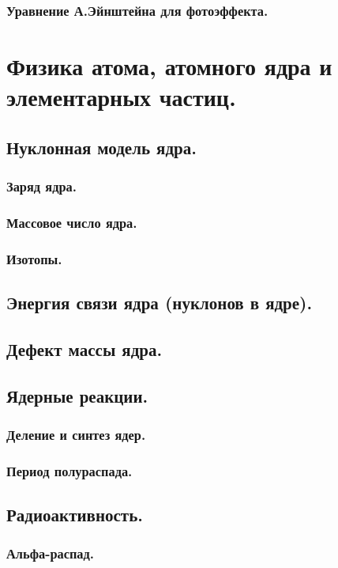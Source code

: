 \documentclass{article}
\begin{document}
        \subsubsection{Уравнение А.Эйнштейна для фотоэффекта.}
\section{Физика атома, атомного ядра и элементарных частиц.}
    \subsection{Нуклонная модель ядра.}
        \subsubsection{Заряд ядра.}
        \subsubsection{Массовое число ядра.}
        \subsubsection{Изотопы.}
    \subsection{Энергия связи ядра (нуклонов в ядре).}
    \subsection{Дефект массы ядра.}
    \subsection{Ядерные реакции.}
        \subsubsection{Деление и синтез ядер.}
        \subsubsection{Период полураспада.}
    \subsection{Радиоактивность.}
        \subsubsection{Альфа-распад.}
\end{document}
